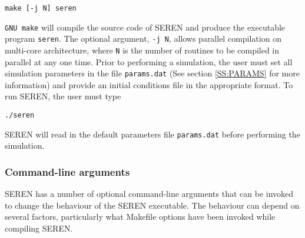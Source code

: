 \documentclass[a4paper]{article}
\newcommand{\var}[1]{\texttt{#1}}
\begin{document}
\var{make [-j N] seren} \newline

\noindent \var{GNU make} will compile the source code of SEREN and produce the executable program \var{seren}.  The optional argument, \var{-j N}, allows parallel compilation on multi-core architecture, where \var{N} is the number of routines to be compiled in parallel at any one time.  Prior to performing a simulation, the user must set all simulation parameters in the file \var{params.dat} (See section \ref{SS:PARAMS} for more information) and provide an initial conditions file in the appropriate format. To run SEREN, the user must type \newline 

\var{./seren} \newline

\noindent SEREN will read in the default parameters file \var{params.dat} before performing the simulation.




\subsubsection{Command-line arguments}
SEREN has a number of optional command-line arguments that can be invoked to change the behaviour of the SEREN executable.  The behaviour can depend on several factors, particularly what Makefile options have been invoked while compiling SEREN.
\end{document}
